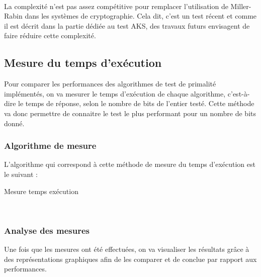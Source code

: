 			\paragraph{}La complexité n'est pas assez compétitive pour remplacer l'utilisation de Miller-Rabin dans les systèmes de cryptographie. Cela dit, c'est un test récent et comme il est décrit dans la partie dédiée au test AKS, des travaux futurs envisagent de faire réduire cette complexité.
			
	\subsection{Mesure du temps d'exécution}
		Pour comparer les performances des algorithmes de test de primalité implémentés, on va mesurer le temps d'exécution de chaque algorithme, c'est-à-dire le temps de réponse, selon le nombre de bits de l'entier testé. Cette méthode va donc permettre de connaitre le test le plus performant pour un nombre de bits donné.
		
		\subsubsection*{Algorithme de mesure}
			L'algorithme qui correspond à cette méthode de mesure du temps d'exécution est le suivant :\\
			
			\begin{algorithm}[H]
				\caption{Mesure temps exécution}\label{MEST}
			\end{algorithm}
			~\\
			
		\subsubsection*{Analyse des mesures}
			Une fois que les mesures ont été effectuées, on va visualiser les résultats grâce à des représentations graphiques afin de les comparer et de conclue par rapport aux performances.
